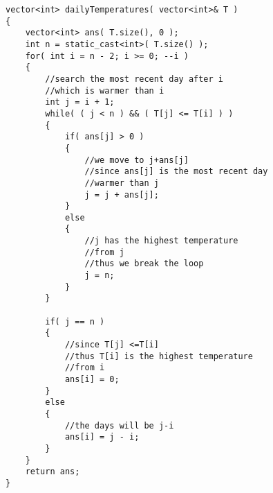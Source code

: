 \setcounter{lstlisting}{0}
\begin{lstlisting}[style=customc, caption={Constant Memory}]
vector<int> dailyTemperatures( vector<int>& T )
{
    vector<int> ans( T.size(), 0 );
    int n = static_cast<int>( T.size() );
    for( int i = n - 2; i >= 0; --i )
    {
        //search the most recent day after i
        //which is warmer than i
        int j = i + 1;
        while( ( j < n ) && ( T[j] <= T[i] ) )
        {
            if( ans[j] > 0 )
            {
                //we move to j+ans[j]
                //since ans[j] is the most recent day
                //warmer than j
                j = j + ans[j];
            }
            else
            {
                //j has the highest temperature
                //from j
                //thus we break the loop
                j = n;
            }
        }

        if( j == n )
        {
            //since T[j] <=T[i]
            //thus T[i] is the highest temperature
            //from i
            ans[i] = 0;
        }
        else
        {
            //the days will be j-i
            ans[i] = j - i;
        }
    }
    return ans;
}
\end{lstlisting} 

